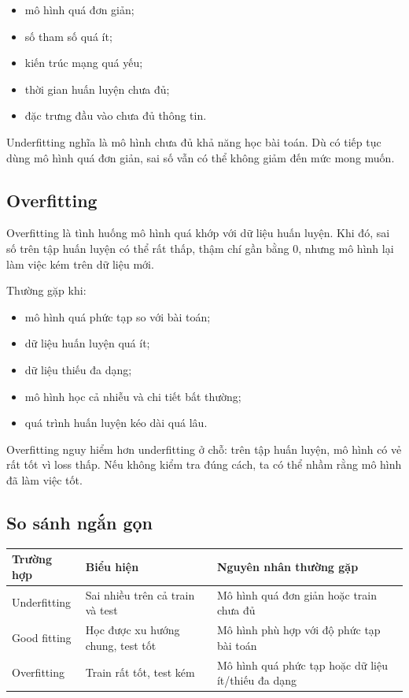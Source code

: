 \begin{itemize}
    \item mô hình quá đơn giản;
    \item số tham số quá ít;
    \item kiến trúc mạng quá yếu;
    \item thời gian huấn luyện chưa đủ;
    \item đặc trưng đầu vào chưa đủ thông tin.
\end{itemize}

\begin{ghinho}
Underfitting nghĩa là mô hình chưa đủ khả năng học bài toán. Dù có tiếp tục dùng mô hình quá đơn giản, sai số vẫn có thể không giảm đến mức mong muốn.
\end{ghinho}

\subsection{Overfitting}

Overfitting là tình huống mô hình quá khớp với dữ liệu huấn luyện. Khi đó, sai số trên tập huấn luyện có thể rất thấp, thậm chí gần bằng 0, nhưng mô hình lại làm việc kém trên dữ liệu mới.

Thường gặp khi:

\begin{itemize}
    \item mô hình quá phức tạp so với bài toán;
    \item dữ liệu huấn luyện quá ít;
    \item dữ liệu thiếu đa dạng;
    \item mô hình học cả nhiễu và chi tiết bất thường;
    \item quá trình huấn luyện kéo dài quá lâu.
\end{itemize}

\begin{canhbao}
Overfitting nguy hiểm hơn underfitting ở chỗ: trên tập huấn luyện, mô hình có vẻ rất tốt vì loss thấp. Nếu không kiểm tra đúng cách, ta có thể nhầm rằng mô hình đã làm việc tốt.
\end{canhbao}

\subsection{So sánh ngắn gọn}

\begin{center}
\begin{tabular}{p{}p{}p{}}
\toprule
Trường hợp & Biểu hiện & Nguyên nhân thường gặp \\
\midrule
Underfitting & Sai nhiều trên cả train và test & Mô hình quá đơn giản hoặc train chưa đủ \\
Good fitting & Học được xu hướng chung, test tốt & Mô hình phù hợp với độ phức tạp bài toán \\
Overfitting & Train rất tốt, test kém & Mô hình quá phức tạp hoặc dữ liệu ít/thiếu đa dạng \\
\bottomrule
\end{tabular}
\end{center}

